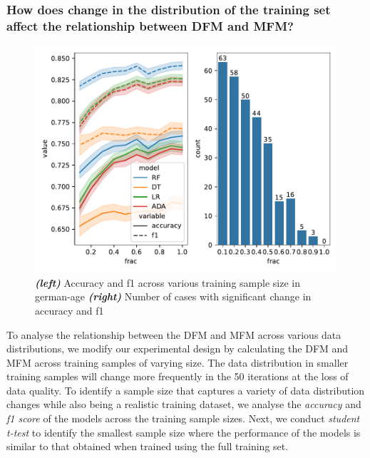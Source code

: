 \documentclass{article}
\begin{document}
\subsubsection{How does change in the distribution of the training set
  affect the relationship between DFM and MFM?}\label{sec:results-full-rel-dist}

\begin{figure}
  \centering
  \includegraphics[width=0.95\linewidth]{training-set-frac-threshold.pdf}
  \caption{\emph{\textbf{(left)}} Accuracy and f1 across various
    training sample size in german-age \emph{\textbf{(right)}} Number
    of cases with significant change in accuracy and f1}
  \label{fig:training-set-frac-threshold}
\end{figure}

To analyse the relationship between the DFM and MFM across
various data distributions, we modify our experimental design by
calculating the DFM and MFM across training samples of varying
size. The data distribution in smaller training samples will change
more frequently in the 50 iterations at the loss of data quality. To
identify a sample size that captures a variety of data distribution
changes while also being a realistic training dataset, we analyse the
\emph{accuracy} and \emph{f1 score} of the models across the training
sample sizes. Next, we conduct \emph{student t-test} to identify the
smallest sample size where the performance of the models is similar to
that obtained when trained using the full training set.
\end{document}
